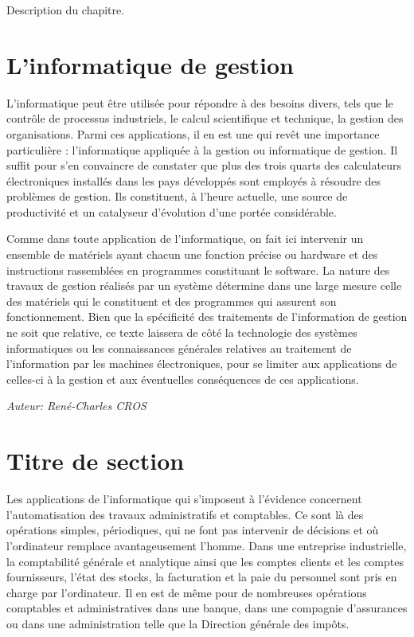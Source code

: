 
    Description du chapitre.

\section{L'informatique de gestion}

     L'informatique peut \^etre utilis\'ee pour r\'epondre \`a des besoins divers, tels que le contr\^ole de processus industriels, le calcul scientifique et technique, la gestion des organisations. Parmi ces applications, il en est une qui rev\^et une importance particuli\`ere : l'informatique appliqu\'ee \`a la gestion ou informatique de gestion. Il suffit pour s'en convaincre de constater que plus des trois quarts des calculateurs \'electroniques install\'es dans les pays d\'evelopp\'es sont employ\'es \`a r\'esoudre des probl\`emes de gestion. Ils constituent, \`a l'heure actuelle, une source de productivit\'e et un catalyseur d'\'evolution d'une port\'ee consid\'erable.

    Comme dans toute application de l'informatique, on fait ici intervenir un ensemble de mat\'eriels ayant chacun une fonction pr\'ecise ou hardware et des instructions rassembl\'ees en programmes constituant le software. La nature des travaux de gestion r\'ealis\'es par un syst\`eme d\'etermine dans une large mesure celle des mat\'eriels qui le constituent et des programmes qui assurent son fonctionnement. Bien que la sp\'ecificit\'e des traitements de l'information de gestion ne soit que relative, ce texte laissera de c\^ot\'e la technologie des syst\`emes informatiques ou les connaissances g\'en\'erales relatives au traitement de l'information par les machines \'electroniques, pour se limiter aux applications de celles-ci \`a la gestion et aux \'eventuelles cons\'equences de ces applications.

{\it Auteur: Ren\'e-Charles CROS}

\section{Titre de section}
        
    Les applications de l'informatique qui s'imposent \`a l'\'evidence concernent l'automatisation des travaux administratifs et comptables. Ce sont l\`a des op\'erations simples, p\'eriodiques, qui ne font pas intervenir de d\'ecisions et o\`u l'ordinateur remplace avantageusement l'homme. Dans une entreprise industrielle, la comptabilit\'e g\'en\'erale et analytique ainsi que les comptes clients et les comptes fournisseurs, l'\'etat des stocks, la facturation et la paie du personnel sont pris en charge par l'ordinateur. Il en est de m\^eme pour de nombreuses op\'erations comptables et administratives dans une banque, dans une compagnie d'assurances ou dans une administration telle que la Direction g\'en\'erale des imp\^ots.

